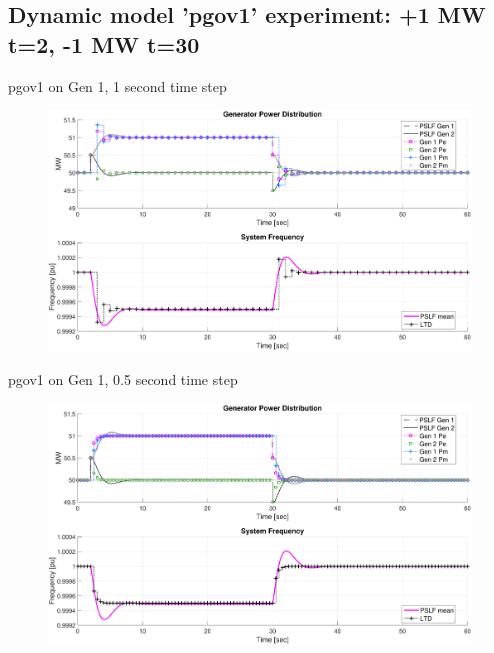 \documentclass[14pt, unknownkeysallowed]{beamer}
\begin{document}
\subsection{Dynamic model 'pgov1' experiment: +1 MW t=2, -1 MW t=30}
\begin{frame}
pgov1 on Gen 1, 1 second time step
\begin{figure}
	\includegraphics[width=\linewidth]{pgov1A}
\end{figure}
\end{frame}
\begin{frame}
pgov1 on Gen 1, 0.5 second time step
\begin{figure}
\includegraphics[width=\linewidth]{pgov1C}
\end{figure}
\end{frame}
\end{document}
